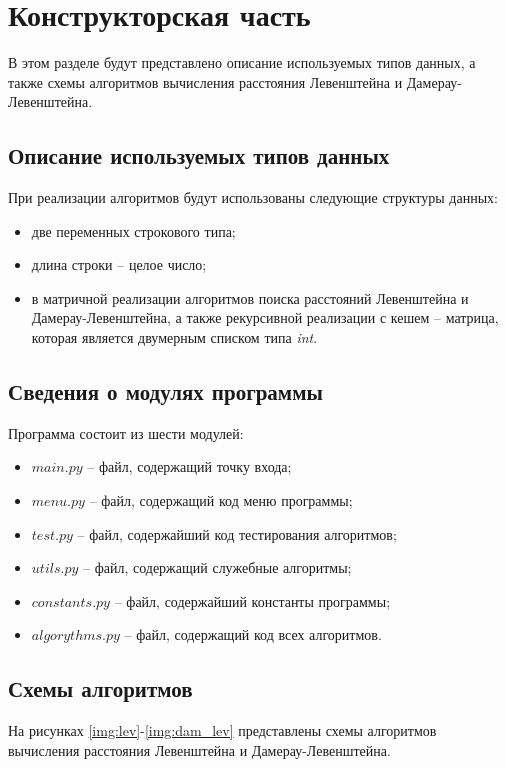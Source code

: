 \chapter{Конструкторская часть}
В этом разделе будут представлено описание используемых типов данных, а также схемы алгоритмов вычисления расстояния Левенштейна и Дамерау-Левенштейна.

\section{Описание используемых типов данных}
При реализации алгоритмов будут использованы следующие структуры данных:

\begin{itemize}
    \item две переменных строкового типа;
    \item длина строки -- целое число;
    \item в матричной реализации алгоритмов поиска расстояний Левенштейна и Дамерау-Левенштейна, а также рекурсивной реализации с кешем -- матрица, которая является двумерным списком типа \textit{int}.
\end{itemize}


\section{Сведения о модулях программы}
Программа состоит из шести модулей:
\begin{itemize}
	\item $main.py$ -- файл, содержащий точку входа;
    \item $menu.py$ -- файл, содержащий код меню программы;
    \item $test.py$ -- файл, содержайший код тестирования алгоритмов;
    \item $utils.py$ -- файл, содержащий служебные алгоритмы;
    \item $constants.py$ -- файл, содержайший константы программы;
    \item $algorythms.py$ -- файл, содержащий код всех алгоритмов. \newline
\end{itemize}


\section{Схемы алгоритмов}
На рисунках \ref{img:lev}-\ref{img:dam_lev} представлены схемы алгоритмов вычисления расстояния Левенштейна и Дамерау-Левенштейна.

